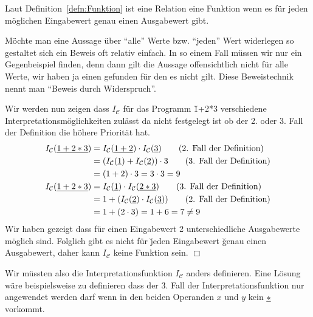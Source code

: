 \begin{beweis}
Laut Definition~\ref{defn:Funktion} ist eine Relation eine Funktion wenn es für jeden möglichen Eingabewert genau einen Ausgabewert gibt.

Möchte man eine Aussage über ``alle'' Werte bzw. ``jeden'' Wert widerlegen so gestaltet sich ein Beweis oft relativ einfach. In so einem
Fall müssen wir nur ein Gegenbeispiel finden, denn dann gilt die Aussage offensichtlich nicht für alle Werte, wir haben ja einen gefunden
für den es nicht gilt. Diese Beweistechnik nennt man ``Beweis durch Widerspruch''.

Wir werden nun zeigen dass $I_{\mathcal{C}}$ für das Programm \u{1+2*3} verschiedene Interpretationsmöglichkeiten zulässt da nicht festgelegt
ist ob der 2. oder 3. Fall der Definition die höhere Priorität hat.
\begin{align*}
I_{\mathcal{C}}(\underline{1+2*3}) &= I_{\mathcal{C}}(\underline{1+2}) \cdot I_{\mathcal{C}}(\underline{3}) \tag{2. Fall der Definition} \\
&= (I_{\mathcal{C}}(\underline{1}) + I_{\mathcal{C}}(\underline{2})) \cdot 3 \tag{3. Fall der Definition} \\
&= (1+2) \cdot 3 = 3 \cdot 3 = 9 \\
I_{\mathcal{C}}(\underline{1+2*3}) &= I_{\mathcal{C}}(\underline{1}) \cdot I_{\mathcal{C}}(\underline{2*3}) \tag{3. Fall der Definition} \\
&= 1 + (I_{\mathcal{C}}(\underline{2}) \cdot I_{\mathcal{C}}(\underline{3})) \tag{2. Fall der Definition} \\
&= 1 + (2 \cdot 3) = 1 + 6 = 7 \neq 9
\end{align*}
Wir haben gezeigt dass für einen Eingabewert 2 unterschiedliche Ausgabewerte möglich sind.
Folglich gibt es nicht für \u{jeden} Eingabewert \u{genau einen} Ausgabewert, daher kann $I_{\mathcal{C}}$ keine Funktion sein. \hfill $\Box$
\end{beweis}
Wir müssten also die Interpretationsfunktion $I_{\mathcal{C}}$ anders definieren. Eine Lösung wäre beispielsweise zu definieren dass der 3. Fall der Interpretationsfunktion
nur angewendet werden darf wenn in den beiden Operanden $x$ und $y$ kein $\underline{*}$ vorkommt.

